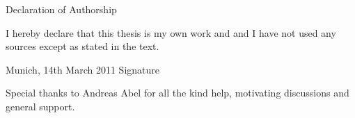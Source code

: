 \documentclass[12pt, a4paper, titlepage]{article}
\begin{document}
\begin{center}
Declaration of Authorship 
\end{center}
\vspace{20mm}   
 
I hereby declare that this thesis is my own work and and I have not used any sources except as stated in the text. 
\vspace{25mm}

\hspace{0.6cm} Munich, 14th March 2011  \hspace{5.0cm} Signature
\vspace{10cm}

Special thanks to Andreas Abel for all the kind help, motivating discussions and general support.
\end{document}
